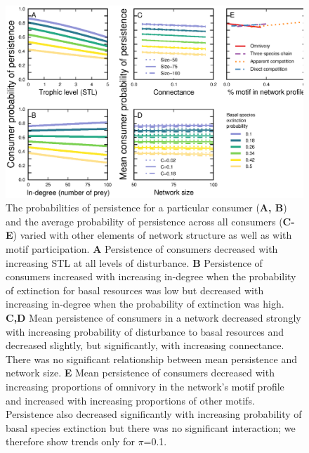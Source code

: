 \documentclass[12pt]{article}
\begin{document}
\begin{spacing}{2.0}
    \begin{figure}[ht!]
        \centering
        \includegraphics[width=\textwidth]{figures/persistence_vs_SC_lm.eps}
        \caption{The probabilities of persistence for a particular consumer (\textbf{A, B}) and the average probability of persistence across all consumers (\textbf{C-E}) varied with other elements of network structure as well as with motif participation.
        \textbf{A} Persistence of consumers decreased with increasing STL at all levels of disturbance.
        \textbf{B} Persistence of consumers increased with increasing in-degree when the probability of extinction for basal resources was low but decreased with increasing in-degree when the probability of extinction was high.
        \textbf{C,D} Mean persistence of consumers in a network decreased strongly with increasing probability of disturbance to basal resources and decreased slightly, but significantly, with increasing connectance. There was no significant relationship between mean persistence and network size.
        \textbf{E} Mean persistence of consumers decreased with increasing proportions of omnivory in the network's motif profile and increased with increasing proportions of other motifs. Persistence also decreased significantly with increasing probability of basal species extinction but there was no significant interaction; we therefore show trends only for $\pi$=0.1.}
        \label{fig:lm_CS}
    \end{figure}


\end{spacing}
\end{document}
